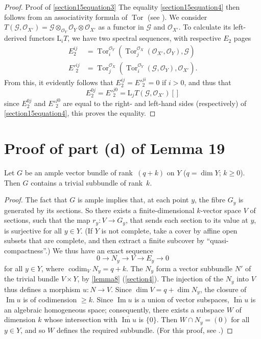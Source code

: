 \documentclass{article}
\theoremstyle{plain}
\newenvironment{lemma}[1]
    {\renewcommand\theinnercustomlemma{#1}\innercustomlemma}
    {\endinnercustomlemma}
\theoremstyle{definition}
\newcommand{\sh}{\mathscr}
\newcommand{\LL}{\mathrm{L}}
\renewcommand{\geq}{\geqslant}
\DeclareMathOperator{\Tor}{Tor}
\DeclareMathOperator{\codim}{codim}
\newcommand{\oldpage}[1]{\marginpar{\footnotesize$\Big\vert$ \textit{p.~#1}}}
\begin{document}
\begin{proof}{Proof of \cref{section15equation3}}
  The equality \cref{section15equation4} then follows from an associativity formula of $\Tor$ (see \cite[p.~345]{3}).
  We consider $T(\sh{G},\sh{O}_{X'}) = \sh{G}\otimes_{\sh{O}_Y}\sh{O}_Y\otimes\sh{O}_{X'}$ as a functor in $\sh{G}$ and $\sh{O}_{X'}$.
  To calculate its left-derived functors $\LL_iT$, we have two spectral sequences, with respective $E_2$ pages
  \begin{align*}
    E_2^{ij} &= \Tor_i^{\sh{O}_Y}(\Tor_j^{\sh{O}_X}(\sh{O}_{X'},\sh{O}_Y),\sh{G})
  \\E'^{ij}_2 &= \Tor_j^{\sh{O}_X}(\Tor_i^{\sh{O}_Y}(\sh{G},\sh{O}_Y),\sh{O}_{X'}).
  \end{align*}
  From this, it evidently follows that $E_2^{ij}=E'^{ji}_2=0$ if $i>0$, and thus that
  \[
    E_2^{0j} = E'^{j0}_2 = \LL_jT(\sh{G},\sh{O}_{X'})[]
  \]
  since $E_2^{0j}$ and $E'^{j0}_2$ are equal to the right- and left-hand sides (respectively) of \cref{section15equation4}, this proves the equality.
\end{proof}


\section{Proof of part (d) of Lemma 19}
\label{section16}

\begin{lemma}{20}
\label{lemma20}
  Let $G$ be an ample vector bundle of rank~$(q+k)$ on $Y$ ($q=\dim Y$; $k\geq0$).
  Then $G$ contains a trivial subbundle of rank~$k$.
\end{lemma}

\begin{proof}
  The fact that $G$ is ample implies that, at each point $y$, the fibre $G_y$ is generated by its sections.
  So there exists a finite-dimensional $k$-vector space $V$ of sections, such that the map $r_y\colon V\to G_y$, that sends each section to its value at $y$, is surjective for all $y\in Y$.
  (If $Y$ is not complete, take a cover by affine open subsets that are complete, and then extract a finite subcover by ``quasi-compactness''.)
  We thus have an exact sequence
  \[
    0 \to N_y \to V \to E_y \to 0
  \]
\oldpage{133}
  for all $y\in Y$, where $\codim_V N_y=q+k$.
  The $N_y$ form a vector subbundle $N'$ of the trivial bundle $V\times Y$, by \cref{lemma8} (\cref{section4}).
  The injection of the $N_y$ into $V$ thus defines a morphism $u\colon N\to V$.
  Since $\dim V=q+\dim N_y$, the closure of $\operatorname{Im}u$ is of codimension $\geq k$.
  Since $\operatorname{Im}u$ is a union of vector subspaces, $\overline{\operatorname{Im}u}$ is an algebraic homogeneous space;
  consequently, there exists a subspace $W$ of dimension $k$ whose intersection with $\overline{\operatorname{Im}u}$ is $\{0\}$.
  Then $W\cap N_y=(0)$ for all $y\in Y$, and so $W$ defines the required subbundle.
  (For this proof, see \cite{1}.)
\end{proof}
\end{document}
